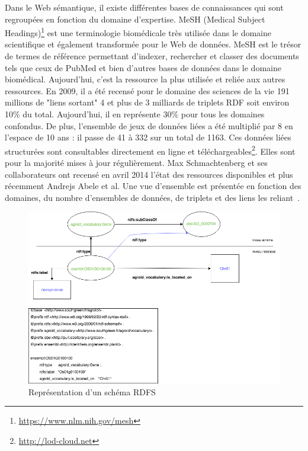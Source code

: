 Dans le Web sémantique, il existe différentes bases de connaissances qui sont regroupées en fonction du domaine d'expertise. MeSH (Medical Subject Headings)\footnote{\url{https://www.nlm.nih.gov/mesh}} est une terminologie biomédicale très utilisée dans le domaine scientifique et également transformée pour le Web de données. MeSH est le trésor de termes de référence permettant d’indexer, rechercher et classer des documents tels que ceux de PubMed et bien d'autres bases de données dans le domaine biomédical. Aujourd'hui, c'est la ressource la plus utilisée et reliée aux autres ressources. En 2009, il a été recensé pour le domaine des sciences de la vie 191 millions de "liens sortant" 4 et plus de 3 milliards de triplets RDF soit environ 10\% du total. Aujourd'hui, il en représente 30\% pour tous les domaines confondus. De plus, l’ensemble de jeux de données liées a été multiplié par 8 en l'espace de 10 ans : il passe de 41 à 332 sur un total de 1163. Ces données liées structurées sont consultables directement en ligne et téléchargeables\footnote{\url{http://lod-cloud.net}}. Elles sont pour la majorité mises à jour régulièrement. Max Schmachtenberg et ses collaborateurs ont recensé en avril 2014 l'état des ressources disponibles et plus récemment Andrejs Abele et al. Une vue d’ensemble est présentée en fonction des domaines, du nombre d’ensembles de données, de triplets et des liens les reliant~\cite{Schmachtenberg-al2014}.\\

\begin{landscape}
\begin{figure}[!ht]
\begin{center}
	\includegraphics[width=1\textwidth]{Figures/RDF-into.png}
\end{center}
\label{RDFS} 
\caption{Représentation d'un schéma RDFS }
\end{figure}

\end{landscape}

